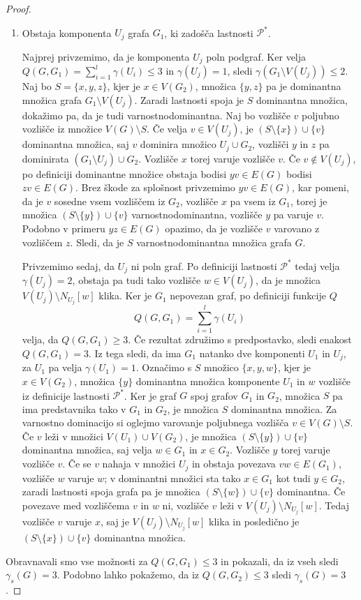 \documentclass[12pt,a4paper,twoside]{article}
\theoremstyle{definition} %
\theoremstyle{plain} %
\numberwithin{equation}{section}  %
\begin{document}
\begin{proof}
\begin{enumerate}[label=($\roman*$)]
\item Obstaja komponenta $U_j$ grafa $G_1$, ki zadošča lastnosti $\mathcal{P^*}$.

Najprej privzemimo, da je komponenta $U_j$ poln podgraf. Ker velja $Q(G, G_1) = \sum\limits_{i=1}^l \gamma(U_i) \leq 3$ in $\gamma(U_j) = 1$, sledi $\gamma(G_1 \setminus V(U_j)) \leq 2$. Naj bo $S = \{x, y, z\}$, kjer je $x \in V(G_2)$, množica $\{y, z\}$ pa je dominantna množica grafa $G_1 \setminus V(U_j)$. Zaradi lastnosti spoja je $S$ dominantna množica, dokažimo pa, da je tudi varnostnodominantna. Naj bo vozlišče $v$ poljubno vozlišče iz množice $V(G) \setminus S$. Če velja $v \in V(U_j)$, je $(S \setminus \{x\}) \cup \{v\}$ dominantna množica, saj $v$ dominira množico $U_j \cup G_2$, vozlišči $y$ in $z$ pa dominirata $(G_1 \setminus U_j) \cup G_2$. Vozlišče $x$ torej varuje vozlišče $v$. Če $v \not\in V(U_j)$, po definiciji dominantne množice obstaja bodisi $yv \in E(G)$ bodisi $zv \in E(G)$. Brez škode za splošnost privzemimo  $yv \in E(G)$, kar pomeni, da je $v$ sosedne vsem vozliščem iz $G_2$, vozlišče $x$ pa vsem iz $G_1$, torej je množica $(S \setminus \{y\}) \cup \{v\}$ varnostnodominantna, vozlišče $y$ pa varuje $v$. Podobno v primeru $yz \in E(G)$ opazimo, da je vozlišče $v$ varovano z vozliščem $z$. Sledi, da je $S$ varnostnodominantna množica grafa $G$.

Privzemimo sedaj, da $U_j$ ni poln graf. Po definiciji lastnosti $\mathcal{P^*}$ tedaj velja $\gamma(U_j) = 2$, obstaja pa tudi tako vozlišče $w \in V(U_j)$, da je množica $V(U_j) \setminus N_{U_j}[w]$ klika. Ker je $G_1$ nepovezan graf, po definiciji funkcije $Q$ $$Q(G, G_1)= \sum\limits_{i=1}^l \gamma(U_i)$$ velja, da $Q(G, G_1) \geq 3$. Če rezultat združimo s predpostavko, sledi enakost $Q(G, G_1) = 3$. Iz tega sledi, da ima $G_1$ natanko dve komponenti $U_1$ in $U_j$, za $U_1$ pa velja $\gamma(U_1)=1$. Označimo s $S$ množico $\{x, y, w\}$, kjer je $x\in V(G_2)$, množica $\{y\}$ dominantna množica komponente $U_1$ in $w$ vozlišče iz definicije lastnosti $\mathcal{P^*}$. Ker je graf $G$ spoj grafov $G_1$ in $G_2$, množica $S$ pa ima predstavnika tako v $G_1$ in $G_2$, je množica $S$ dominantna množica. Za varnostno dominacijo si oglejmo varovanje poljubnega vozlišča $v \in V(G) \setminus S$. Če $v$ leži v množici $V(U_1) \cup V(G_2)$, je množica $(S \setminus \{y\}) \cup \{v\}$ dominantna množica, saj velja $w\in G_1$ in $x \in G_2$. Vozlišče $y$ torej varuje vozlišče $v$. Če se $v$ nahaja v množici $U_j$ in obstaja povezava $vw \in E(G_1)$, vozlišče $w$ varuje $w$; v dominantni množici sta tako $x\in G_1$ kot tudi $y \in G_2$, zaradi lastnosti spoja grafa pa je množica $(S \setminus \{w\}) \cup \{v\}$ dominantna. Če povezave med vozliščema $v$ in $w$ ni, vozlišče $v$ leži v $V(U_j) \setminus N_{U_j}[w]$. Tedaj vozlišče $v$ varuje $x$, saj je $V(U_j) \setminus N_{U_j}[w]$ klika in posledično je $(S \setminus \{x\}) \cup \{v\}$ dominantna množica.
 \end{enumerate}
Obravnavali smo vse možnosti za $Q(G, G_1) \leq 3$ in pokazali, da iz vseh sledi $\gamma_s(G) = 3$. Podobno lahko pokažemo, da iz  $Q(G, G_2) \leq 3$ sledi $\gamma_s(G) = 3$.
 \end{proof}
 
\end{document}
